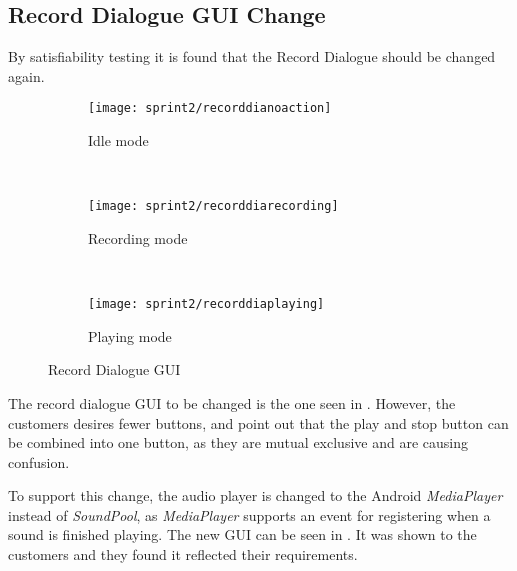 \subsection{Record Dialogue GUI Change}
By satisfiability testing it is found that the Record Dialogue should be changed again.

\begin{figure}[h]
        \centering
        \begin{subfigure}[b]{0.3\textwidth}
                \texttt{[image: sprint2/recorddianoaction]}
                \caption{Idle mode}
                \label{fig:recordnoaction}
        \end{subfigure}%
        ~ %
        \begin{subfigure}[b]{0.3\textwidth}
                \texttt{[image: sprint2/recorddiarecording]}
                \caption{Recording mode}
                \label{fig:recordrecording}
        \end{subfigure}
        ~ %
        \begin{subfigure}[b]{0.3\textwidth}
                \texttt{[image: sprint2/recorddiaplaying]}
                \caption{Playing mode}
                \label{fig:recordplaying}
        \end{subfigure}
        \caption{Record Dialogue GUI}\label{fig:recorddia}
\end{figure}

The record dialogue GUI to be changed is the one seen in .
However, the customers desires fewer buttons, and point out that the play and stop button can be combined into one button, as they are mutual exclusive and are causing confusion.

To support this change, the audio player is changed to the Android \textit{MediaPlayer} instead of \textit{SoundPool}, as \textit{MediaPlayer} supports an event for registering when a sound is finished playing.
The new GUI can be seen in .
It was shown to the customers and they found it reflected their requirements.